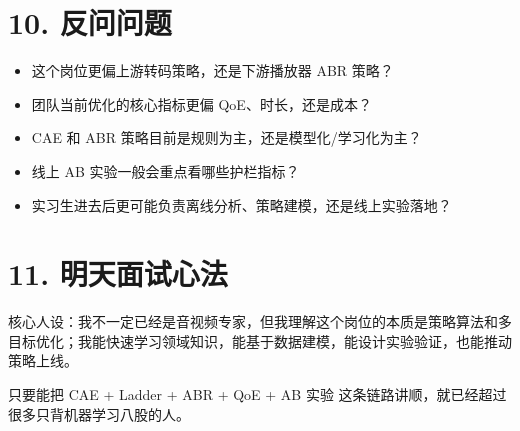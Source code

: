 ﻿\documentclass[11pt,a4paper]{ctexart}
\newcommand{\keybox}[1]{\begin{answerbox}#1\end{answerbox}}
\begin{document}
\section{10. 反问问题}
\begin{itemize}
  \item 这个岗位更偏上游转码策略，还是下游播放器 ABR 策略？
  \item 团队当前优化的核心指标更偏 QoE、时长，还是成本？
  \item CAE 和 ABR 策略目前是规则为主，还是模型化/学习化为主？
  \item 线上 AB 实验一般会重点看哪些护栏指标？
  \item 实习生进去后更可能负责离线分析、策略建模，还是线上实验落地？
\end{itemize}

\section{11. 明天面试心法}
\keybox{核心人设：我不一定已经是音视频专家，但我理解这个岗位的本质是策略算法和多目标优化；我能快速学习领域知识，能基于数据建模，能设计实验验证，也能推动策略上线。

只要能把 CAE + Ladder + ABR + QoE + AB 实验 这条链路讲顺，就已经超过很多只背机器学习八股的人。}
\end{document}
